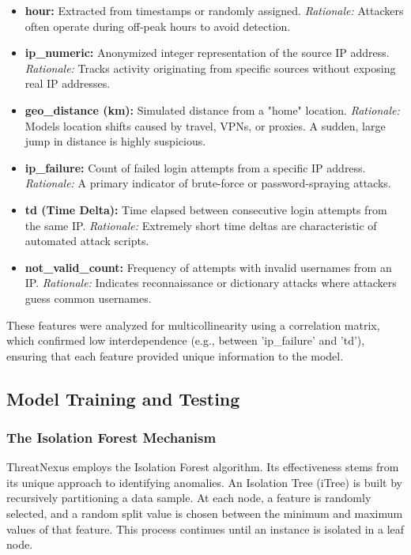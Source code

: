 \documentclass[conference]{IEEEtran}
\begin{document}
\begin{itemize}
    \item \textbf{hour:} Extracted from timestamps or randomly assigned. \textit{Rationale:} Attackers often operate during off-peak hours to avoid detection.
    \item \textbf{ip\_numeric:} Anonymized integer representation of the source IP address. \textit{Rationale:} Tracks activity originating from specific sources without exposing real IP addresses.
    \item \textbf{geo\_distance (km):} Simulated distance from a "home" location. \textit{Rationale:} Models location shifts caused by travel, VPNs, or proxies. A sudden, large jump in distance is highly suspicious.
    \item \textbf{ip\_failure:} Count of failed login attempts from a specific IP address. \textit{Rationale:} A primary indicator of brute-force or password-spraying attacks.
    \item \textbf{td (Time Delta):} Time elapsed between consecutive login attempts from the same IP. \textit{Rationale:} Extremely short time deltas are characteristic of automated attack scripts.
    \item \textbf{not\_valid\_count:} Frequency of attempts with invalid usernames from an IP. \textit{Rationale:} Indicates reconnaissance or dictionary attacks where attackers guess common usernames.
\end{itemize}

These features were analyzed for multicollinearity using a correlation matrix, which confirmed low interdependence (e.g., between 'ip\_failure' and 'td'), ensuring that each feature provided unique information to the model.

\subsection{Model Training and Testing}
\subsubsection{The Isolation Forest Mechanism}
ThreatNexus employs the Isolation Forest algorithm. Its effectiveness stems from its unique approach to identifying anomalies. An Isolation Tree (iTree) is built by recursively partitioning a data sample. At each node, a feature is randomly selected, and a random split value is chosen between the minimum and maximum values of that feature. This process continues until an instance is isolated in a leaf node.
\end{document}
